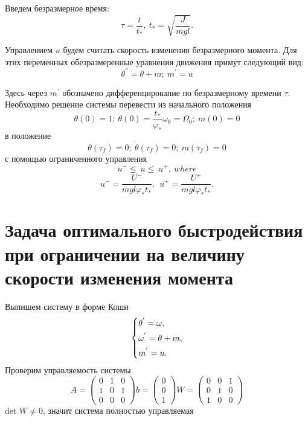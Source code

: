 \documentclass[a4paper,14pt]{article}
\theoremstyle{plain} %
\theoremstyle{definition} %
\theoremstyle{remark} %
\begin{document}
{Введем безразмерное время:
\[
    \tau=\frac{t}{t_\ast},\ t_\ast=\sqrt{\frac{J}{mgl}}.
\]

Управлением $u$ будем считать скорость изменения безразмерного
момента. Для этих переменных обезразмеренные уравнения движения
примут следующий вид:
\[
    \theta^{''}=\theta+m;\ m^{'}=u
\]

Здесь через $m^{'}$ обозначено дифференцирование по
безразмерному времени $\tau$. Необходимо решение системы
перевести из начального положения
\begin{equation}\label{9}
    \theta(0)=1;\ \dot{\theta}(0)=\frac{t_\ast}{\varphi_\ast}\omega_0=\Omega_0;\ m(0)=0
\end{equation}
в положение
\begin{equation}\label{9}
    \theta(\tau_f)=0;\ \dot{\theta}(\tau_f)=0;\ m(\tau_f)=0
\end{equation}
с помощью ограниченного управления
\[
    u^-\le\ u\le\ u^+,\ where
\]
\[
    u^-=\frac{U^-}{mgl\varphi_\ast t_\ast},\ \ u^+=\frac{U^+}{mgl\varphi_\ast t_\ast}.
\]
\newpage
\section{Задача оптимального быстродействия при ограничении на величину скорости изменения момента}
Выпишем систему в форме Коши
\begin{equation}\label{koshisystem}
    \left\{ {\begin{aligned}
                 & \theta^{'} = \omega , \hfill   \\
                 & \omega^{'} = \theta+m , \hfill \\
                 & m^{'} = u . \hfill             \\
            \end{aligned}} \right.
\end{equation}
Проверим управляемость системы
\begin{equation*}
    A =
    \begin{pmatrix}
        0 & 1 & 0 \\
        1 & 0 & 1 \\
        0 & 0 & 0
    \end{pmatrix}
    b =
    \begin{pmatrix}
        0 \\
        0 \\
        1
    \end{pmatrix}
    W =
    \begin{pmatrix}
        0 & 0 & 1 \\
        0 & 1 & 0 \\
        1 & 0 & 0
    \end{pmatrix}
\end{equation*}
det $W\neq0$, значит система полностью управляемая

}
\end{document}
